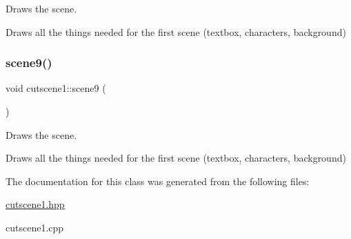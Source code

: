 Draws the scene. 

Draws all the things needed for the first scene (textbox, characters, background) \mbox{\label{classcutscene1_a5876edaf8fe041660e98c7aa8ca9c18b}} 
\subsubsection{\texorpdfstring{scene9()}{scene9()}}
{\footnotesize\ttfamily void cutscene1\+::scene9 (\begin{DoxyParamCaption}{ }\end{DoxyParamCaption})}



Draws the scene. 

Draws all the things needed for the first scene (textbox, characters, background) 

The documentation for this class was generated from the following files\+:\begin{DoxyCompactItemize}
\item 
\hyperlink{cutscene1_8hpp}{cutscene1.\+hpp}\item 
cutscene1.\+cpp\end{DoxyCompactItemize}
